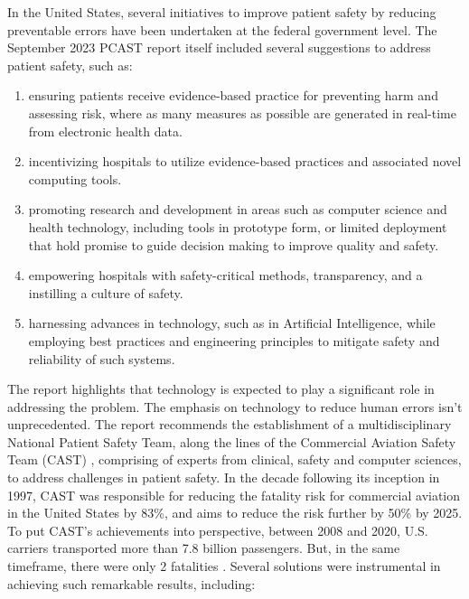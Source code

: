 In the United States, several initiatives to improve patient safety by
reducing preventable errors have been undertaken at the federal government
level. The September 2023 PCAST report itself included several suggestions to
address patient safety, such as:
\begin{enumerate}[label=(\roman*)]
  \item ensuring patients receive evidence-based practice for preventing
    harm and assessing risk, where as many measures as possible are
    generated in real-time from electronic health data.
  \item incentivizing hospitals to utilize evidence-based practices
    and associated novel computing tools.
  \item promoting research and development in areas such as
    computer science and health technology,
    including tools in prototype form, or limited deployment that
    hold promise to guide decision making to improve quality and safety.
  \item empowering hospitals with safety-critical methods, transparency,
    and a instilling a culture of safety.
  \item harnessing advances in technology, such as in Artificial Intelligence,
    while employing best practices and engineering principles to mitigate safety
    and reliability of such systems.
\end{enumerate}
The report highlights that technology is expected to play a significant role in
addressing the problem. The emphasis on technology to reduce human errors
isn't unprecedented. The report recommends the establishment of a
multidisciplinary National Patient Safety Team, along the lines of
the Commercial Aviation Safety Team (CAST) \cite{CASTUrl}, comprising of
experts from clinical, safety and computer sciences, to address challenges
in patient safety. In the decade following its inception in 1997,
CAST was responsible for reducing the fatality risk for commercial aviation
in the United States by 83\%, and aims to reduce the risk further by 50\% by
2025. To put CAST's achievements into perspective, between 2008 and 2020,
U.S. carriers transported more than 7.8 billion passengers. But, in the same
timeframe, there were only 2 fatalities \cite{CASTSafetyReport20}.
Several solutions were instrumental in achieving such remarkable results, including:
